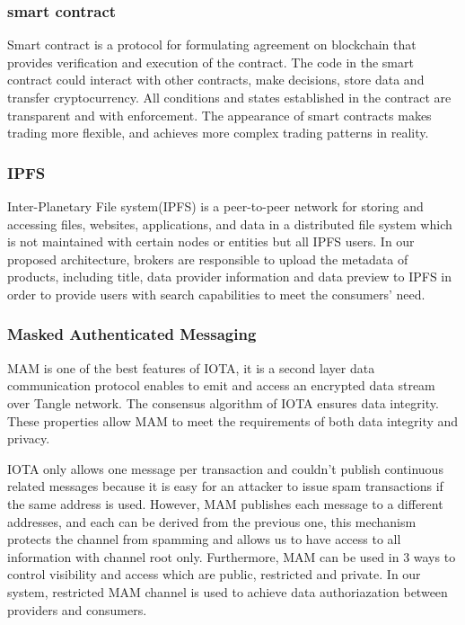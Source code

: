 \documentclass[journal,a4paper]{IEEEtran}
\begin{document}
\subsubsection{smart contract}
Smart contract\cite{smartContract} is a protocol for formulating agreement on blockchain that provides verification and execution of the contract. The code in the smart contract could interact with other contracts, make decisions, store data and transfer cryptocurrency. All conditions and states established in the contract are transparent and with enforcement. The appearance of smart contracts makes trading more flexible, and achieves more complex trading patterns in reality.

\subsubsection{IPFS}
Inter-Planetary File system(IPFS)\cite{IPFS} is a peer-to-peer network for storing and accessing files, websites, applications, and data in a distributed file system which is not maintained with certain nodes or entities but all IPFS users. In our proposed architecture, brokers are responsible to upload the metadata of products, including title, data provider information and data preview to IPFS in order to provide users with search capabilities to meet the consumers' need.

\subsubsection{Masked Authenticated Messaging}
MAM\cite{MAM} is one of the best features of IOTA, it is a second layer data communication protocol enables to emit and access an encrypted data stream over Tangle network. The consensus algorithm of IOTA ensures data integrity. These properties allow MAM to meet the requirements of both data integrity and privacy.

IOTA only allows one message per transaction and couldn't publish continuous related messages because it is easy for an attacker to issue spam transactions if the same address is used. However, MAM publishes each message to a different addresses, and each can be derived from the previous one, this mechanism protects the channel from spamming and allows us to have access to all information with channel root only. Furthermore, MAM can be used in 3 ways to control visibility and access which are public, restricted and private. In our system, restricted MAM channel is used to achieve data authoriazation between providers and consumers.
\end{document}
